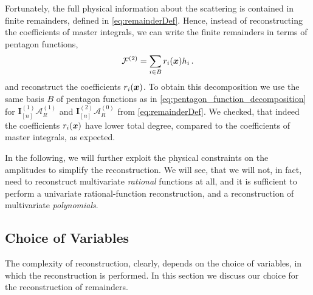 Fortunately, the full physical information about the scattering is contained in finite remainders, defined in \cref{eq:remainderDef}.
Hence, instead of reconstructing the coefficients of master integrals, we can write the finite remainders in terms of pentagon functions,
\begin{equation}
  \mathcal{F}^{(2)} = \sum_{i \in B} r_i(\vb*{x}) h_i\,.
  \label{eq:remainderPentagon}
\end{equation}
and reconstruct the coefficients $r_i(\vb*{x})$. 
To obtain this decomposition we use the same basis $B$ of pentagon functions as in \cref{eq:pentagon_function_decomposition} 
for $\mathbf{I}_{[n]}^{(1)}\mathcal{A}_R^{(1)}$ and $\mathbf{I}_{[n]}^{(2)}\mathcal{A}_R^{(0)}$ from \cref{eq:remainderDef}.
We checked, that indeed the coefficients $r_i(\vb*{x})$ have lower total degree, compared to the coefficients of master integrals, as expected.

In the following, we will further exploit the physical constraints on the amplitudes to simplify
the reconstruction. We will see, that we will not, in fact, need to reconstruct multivariate \emph{rational} functions at all,
and it is sufficient to perform a univariate rational-function reconstruction, and a reconstruction of
multivariate \emph{polynomials}.

\subsection{Choice of Variables}

The complexity of reconstruction, clearly, depends on the choice of variables, in which 
the reconstruction is performed. In this section we discuss our choice for the reconstruction of remainders.

